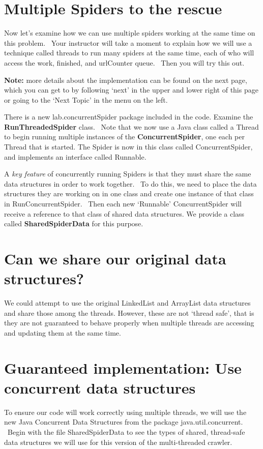 \documentclass[letterpaper,10pt,openany,oneside]{sphinxmanual}
\begin{document}
\section{Multiple Spiders to the rescue}
\label{SpiderLabpart2/SpiderLabpart2:multiple-spiders-to-the-rescue}
Now let’s examine how we can use multiple spiders working at the
same time on this problem.  Your instructor will take a moment to
explain how we will use a technique called threads to run many
spiders at the same time, each of who will access the work,
finished, and urlCounter queue.  Then you will try this out.

\textbf{Note:} more details about the implementation can be found on the
next page, which you can get to by following `next' in the upper and lower
right of this page or going to the `Next Topic' in the menu on the left.

There is a new lab.concurrentSpider package included in the code.
Examine the \textbf{RunThreadedSpider} class.  Note that we now use
a Java class called a Thread to begin running multiple instances of
the \textbf{ConcurrentSpider}, one each per Thread that is started.
The Spider is now in this class called
ConcurrentSpider, and implements an interface called Runnable.

A \emph{key feature} of concurrently running Spiders is that they must
share the same data structures in order to work together.  To do
this, we need to place the data structures they are working on in
one class and create one instance of that class in
RunConcurrentSpider.  Then each new ‘Runnable’ ConcurrentSpider
will receive a reference to that class of shared data structures.
We provide a class called \textbf{SharedSpiderData} for this purpose.


\section{Can we share our original data structures?}
\label{SpiderLabpart2/SpiderLabpart2:can-we-share-our-original-data-structures}
We could attempt to use the original LinkedList and ArrayList data structures
and share those among the threads.  However, these are not `thread safe',
that is they are not guaranteed to behave properly when multiple threads are
accessing and updating them at the same time.


\section{Guaranteed implementation: Use concurrent data structures}
\label{SpiderLabpart2/SpiderLabpart2:guaranteed-implementation-use-concurrent-data-structures}
To ensure our code will work correctly using multiple threads, we will
use the new Java Concurrent Data
Structures from the package java.util.concurrent.  Begin with the
file SharedSpiderData to see the types of shared, thread-safe data
structures we will use for this version of the multi-threaded
crawler.
\end{document}
